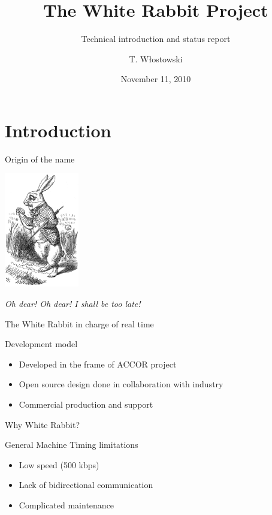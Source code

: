 \documentclass[xcolor=dvipsnames]{beamer}
\title[WR Project Status\hspace{2em}\insertframenumber/
\inserttotalframenumber]{The White Rabbit Project}
\subtitle{Technical introduction and status report}
\author{T. Włostowski}
\date{November 11, 2010}
\institute%
{
  BE-CO Hardware and Timing section\\
  CERN
 }
\begin{document}
\frame{\titlepage}


\section{Introduction}
\begin{frame}{Origin of the name}
\begin{center}
\includegraphics[height=5cm]{../../figures/misc/Alice-wr.jpg}

\textit{Oh dear! Oh dear! I shall be too late!}\\
\begin{small}
The White Rabbit in charge of real time
\end{small}
\end{center}
\end{frame}


\begin{frame}{Development model}
\begin{itemize}
\item Developed in the frame of ACCOR project
\item Open source design done in collaboration with industry
\item Commercial production and support
\end{itemize}
\end{frame}

\begin{frame}{Why White Rabbit?}
\begin{block}{General Machine Timing limitations}
\begin{itemize}
\item Low speed (500 kbps)
\item Lack of bidirectional communication
\item Complicated maintenance
\end{itemize}
\end{block}
\end{frame}
\end{document}
